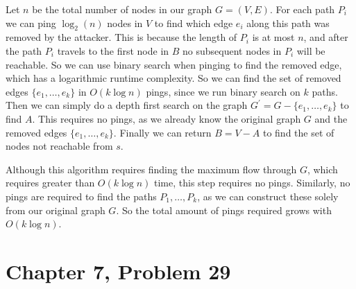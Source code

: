 \documentclass[12pt]{article}
\begin{document}
Let \(n\) be the total number of nodes in our graph \(G=(V,E)\). For each path \(P_i\) we can ping \(\log_2(n)\) nodes in \(V\) to find which edge \(e_i\) along
this path was removed by the attacker. This is because the length of \(P_i\) is at most \(n\), and after the path \(P_i\) travels to the first node in \(B\)
no subsequent nodes in \(P_i\) will be reachable. So we can use binary search when pinging to find the removed edge, which has a logarithmic runtime complexity.
So we can find the set of removed edges \(\{e_1,\ldots,e_k\}\) in \(O(k\log n)\) pings, since we run binary search on \(k\) paths. Then
we can simply do a depth first search on the graph \(G^\prime=G-\{e_1,\ldots,e_k\}\) to find \(A\). This requires no pings, as we already know the original graph
\(G\) and the removed edges \(\{e_1,\ldots,e_k\}\). Finally we can return \(B=V-A\) to find the set of nodes not reachable from \(s\).

Although this algorithm requires finding the maximum flow through \(G\), which requires greater than \(O(k\log n)\) time, this step requires no pings. Similarly, no
pings are required to find the paths \(P_1,\ldots,P_k\), as we can construct these solely from our original graph \(G\). So the total amount of pings required grows with
\(O(k\log n)\).

\pagebreak

\section*{Chapter 7, Problem 29}
\end{document}
